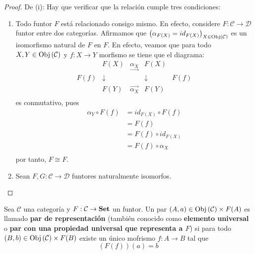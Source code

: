 \documentclass[12pt]{report}
\newcounter{it}
\theoremstyle{largebreak}
\newcommand\cf[3]{\ensuremath{#1:#2\rightarrow#3}}
\newcommand{\Obj}[1]{\ensuremath{\textup{Obj}\left(#1\right)}}
\newcommand{\Cat}[1]{\ensuremath{\textup{\textbf{#1}}}}
\begin{document}
    \begin{proof}
        De (i): Hay que verificar que la relación cumple tres condiciones:
        \begin{enumerate}
            \item Todo funtor $F$ está relacionado consigo mismo. En efecto, considere $\cf{F}{\mathcal{C}}{\mathcal{D}}$ funtor entre dos categorías. Afirmamos que $\left(\alpha_{ F(X)}=id_{ F(X)} \right)_{ X\in\Obj{\mathcal{C}}}$ es un isomorfismo natural de $F$ en $F$. En efecto, veamos que para todo $X,Y\in\Obj{\mathcal{C}}$ y $\cf{f}{X}{Y}$ morfismo se tiene que el diagrama:
            \begin{equation*}
                \begin{array}{rcccl}
                    & F(X) & \underset{\longrightarrow}{\alpha_{X}} & F(X) &\\
                    F(f) & \downarrow & & \downarrow & F(f) \\
                    & F(Y) & \overset{\longrightarrow}{\alpha_{X}} & F(Y) &\\
                \end{array}
            \end{equation*}
             es conmutativo, pues
             \begin{equation*}
                \begin{split}
                    \alpha_Y\circ F(f)&=id_{F(X)}\circ F(f)\\
                    &=F(f)\\
                    &=F(f)\circ id_{F(X)}\\
                    &=F(f)\circ \alpha_X\\
                \end{split}
             \end{equation*}
             por tanto, $F\cong F$.
             \item Sean $\cf{F,G}{\mathcal{C}}{\mathcal{D}}$ funtores naturalmente isomorfos.
        \end{enumerate}
    \end{proof}

    \begin{mydef}
        Sea $\mathcal{C}$ una categoría y $\cf{F}{\mathcal{C}}{\Cat{Set}}$ un funtor. Un par $(A,a)\in\Obj{\mathcal{C}}\times F(A)$ es llamado \textbf{par de representación} (también conocido como \textbf{elemento universal} o \textbf{par con una propiedad universal que representa a $F$}) si para todo $(B,b)\in\Obj{\mathcal{C}}\times F(B)$ existe un único mofrismo $\cf{f}{A}{B}$ tal que
        \begin{equation*}
            \left(F(f)\right)(a)=b
        \end{equation*}
    \end{mydef}
\end{document}
